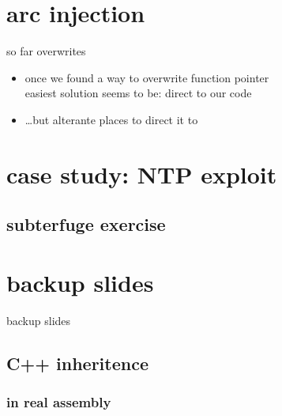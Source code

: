 \section{arc injection}
\begin{frame}{so far overwrites}
    \begin{itemize}
    \item once we found a way to overwrite function pointer\\
          easiest solution seems to be: direct to our code
    \item \ldots but alterante places to direct it to
    \end{itemize}
\end{frame}



\section{case study: NTP exploit}


\subsection{subterfuge exercise}


\section{backup slides}
\begin{frame}{backup slides}
\end{frame}
\subsection{C++ inheritence}


\subsubsection{in real assembly}




